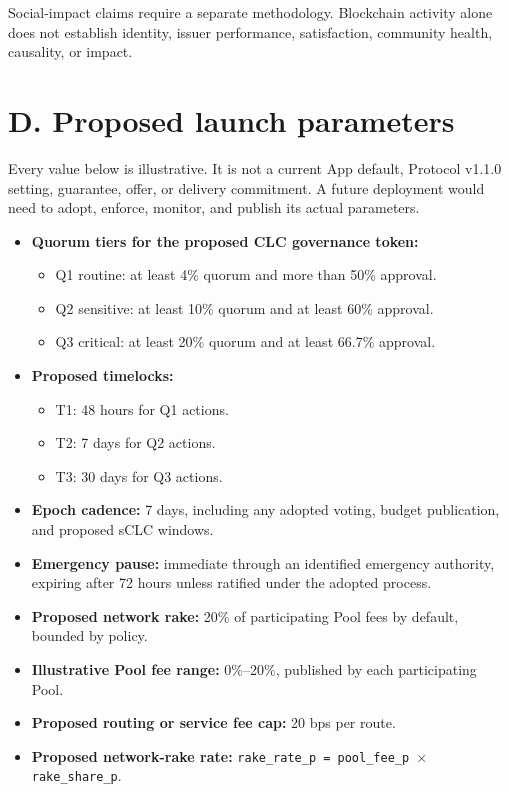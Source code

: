 \documentclass[11pt]{article}
\begin{document}
Social-impact claims require a separate methodology. Blockchain activity alone does not establish identity, issuer performance, satisfaction, community health, causality, or impact.


\section*{D. Proposed launch parameters}

Every value below is illustrative. It is not a current App default, Protocol v1.1.0 setting, guarantee, offer, or delivery commitment. A future deployment would need to adopt, enforce, monitor, and publish its actual parameters.

\begin{itemize}[leftmargin=*]
\item \textbf{Quorum tiers for the proposed CLC governance token:}
\begin{itemize}[leftmargin=*]
\item Q1 routine: at least 4\% quorum and more than 50\% approval.
\item Q2 sensitive: at least 10\% quorum and at least 60\% approval.
\item Q3 critical: at least 20\% quorum and at least 66.7\% approval.
\end{itemize}
\item \textbf{Proposed timelocks:}
\begin{itemize}[leftmargin=*]
\item T1: 48 hours for Q1 actions.
\item T2: 7 days for Q2 actions.
\item T3: 30 days for Q3 actions.
\end{itemize}
\item \textbf{Epoch cadence:} 7 days, including any adopted voting, budget publication, and proposed sCLC windows.
\item \textbf{Emergency pause:} immediate through an identified emergency authority, expiring after 72 hours unless ratified under the adopted process.
\item \textbf{Proposed network rake:} 20\% of participating Pool fees by default, bounded by policy.
\item \textbf{Illustrative Pool fee range:} 0\%--20\%, published by each participating Pool.
\item \textbf{Proposed routing or service fee cap:} 20 bps per route.
\item \textbf{Proposed network-rake rate:} \texttt{rake\_rate\_p = pool\_fee\_p $\times$ rake\_share\_p}.

\end{itemize}
\end{document}

